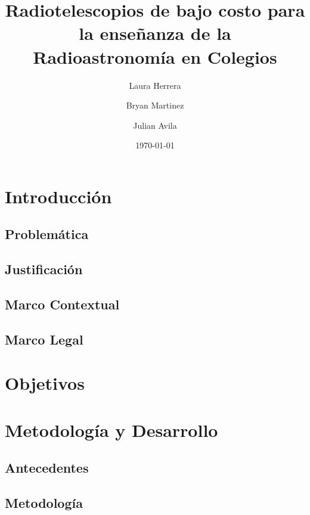 \documentclass[sn-mathphys]{svmono}
\title{\Huge \textbf{Radiotelescopios de bajo costo para la enseñanza de la Radioastronomía en Colegios}}
\author{Laura Herrera \and Bryan Martinez \and Julian Avila}
\date{\today}
\begin{document}
\maketitle

\tableofcontents

\newpage

\chapter{Introducción}
\section{Problemática}


\section{Justificación}


\section{Marco Contextual}


\section{Marco Legal}


\chapter{Objetivos}


\chapter{Metodología y Desarrollo}

\section{Antecedentes}



\section{Metodología}



\printbibliography
\end{document}
